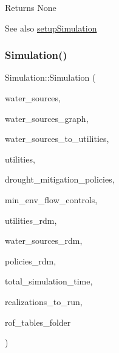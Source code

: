 \begin{DoxyReturn}{Returns}
None
\end{DoxyReturn}
\begin{DoxySeeAlso}{See also}
\mbox{\hyperlink{classSimulation_ac9ff965191f13b1ce044344fd1e5d0ac}{setup\+Simulation}} 
\end{DoxySeeAlso}
\mbox{\label{classSimulation_a68f43435cf8308d5415cdfcdb84e1fac}} 
\subsubsection{\texorpdfstring{Simulation()}{Simulation()}\hspace{0.1cm}{\footnotesize\ttfamily [3/3]}}
{\footnotesize\ttfamily Simulation\+::\+Simulation (\begin{DoxyParamCaption}\item[{vector$<$ \mbox{\hyperlink{classWaterSource}{Water\+Source}} $\ast$$>$ \&}]{water\+\_\+sources,  }\item[{\mbox{\hyperlink{classGraph}{Graph}} \&}]{water\+\_\+sources\+\_\+graph,  }\item[{const vector$<$ vector$<$ int $>$$>$ \&}]{water\+\_\+sources\+\_\+to\+\_\+utilities,  }\item[{vector$<$ \mbox{\hyperlink{classUtility}{Utility}} $\ast$$>$ \&}]{utilities,  }\item[{const vector$<$ \mbox{\hyperlink{classDroughtMitigationPolicy}{Drought\+Mitigation\+Policy}} $\ast$$>$ \&}]{drought\+\_\+mitigation\+\_\+policies,  }\item[{vector$<$ \mbox{\hyperlink{classMinEnvFlowControl}{Min\+Env\+Flow\+Control}} $\ast$$>$ \&}]{min\+\_\+env\+\_\+flow\+\_\+controls,  }\item[{vector$<$ vector$<$ double $>$$>$ \&}]{utilities\+\_\+rdm,  }\item[{vector$<$ vector$<$ double $>$$>$ \&}]{water\+\_\+sources\+\_\+rdm,  }\item[{vector$<$ vector$<$ double $>$$>$ \&}]{policies\+\_\+rdm,  }\item[{const unsigned long}]{total\+\_\+simulation\+\_\+time,  }\item[{vector$<$ unsigned long $>$ \&}]{realizations\+\_\+to\+\_\+run,  }\item[{string \&}]{rof\+\_\+tables\+\_\+folder }\end{DoxyParamCaption})}



